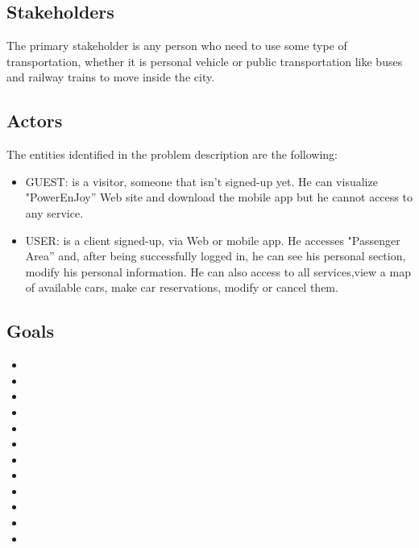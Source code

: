\subsection{Stakeholders}
	The primary stakeholder is any person who need to use some type of transportation, whether it is personal vehicle or public transportation like buses and railway trains to move inside the city.


\subsection{Actors}
The entities identified in the problem description are the following: 
\begin{itemize}
	\item GUEST: is a visitor, someone that isn't signed-up yet. He can visualize
	"PowerEnJoy'' Web site and download the mobile app but he cannot
	access to any service.
	\item USER: is a client signed-up, via Web or mobile app. He accesses
	"Passenger Area'' and, after being successfully logged in, he can see
	his personal section, modify his personal information. He can also
	access to all services,view a map of available cars, make car reservations, modify or
	cancel them.
\end{itemize}

\subsection{Goals}
\begin{itemize}
	\item {}
	\item {}
	\item {}
	\item {}
	\item {}
	\item {}
	\item {}
	\item {}
	\item {}
	\item {}
	\item {}
	\item {}
\end{itemize}



\pagebreak{}


